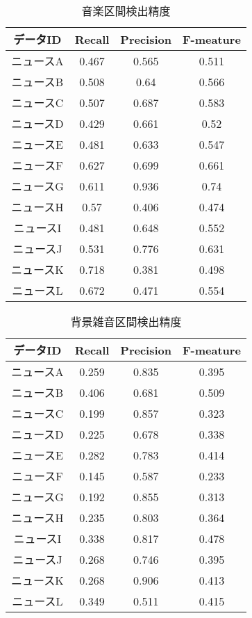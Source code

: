 \begin{table}[H]
  \begin{center}
    \caption{音楽区間検出精度 \label{table:NHK_music_RPF}}
    \begin{tabular}{|c||c|c|c|} \hline
データID & Recall & Precision & F-meature \\ \hline
ニュースA & 0.467 & 0.565 & 0.511 \\ \hline
ニュースB & 0.508 & 0.64 & 0.566 \\ \hline
ニュースC & 0.507 & 0.687 & 0.583 \\ \hline
ニュースD & 0.429 & 0.661 & 0.52 \\ \hline
ニュースE & 0.481 & 0.633 & 0.547 \\ \hline
ニュースF & 0.627 & 0.699 & 0.661 \\ \hline
ニュースG & 0.611 & 0.936 & 0.74 \\ \hline
ニュースH & 0.57 & 0.406 & 0.474 \\ \hline
ニュースI & 0.481 & 0.648 & 0.552 \\ \hline
ニュースJ & 0.531 & 0.776 & 0.631 \\ \hline
ニュースK & 0.718 & 0.381 & 0.498 \\ \hline
ニュースL & 0.672 & 0.471 & 0.554 \\ \hline
    \end{tabular}
  \end{center}
\end{table}

\begin{table}[H]
  \begin{center}
    \caption{背景雑音区間検出精度 \label{table:NHK_noise_RPF}}
    \begin{tabular}{|c||c|c|c|} \hline
データID & Recall & Precision & F-meature \\ \hline
ニュースA & 0.259 & 0.835 & 0.395 \\ \hline
ニュースB & 0.406 & 0.681 & 0.509 \\ \hline
ニュースC & 0.199 & 0.857 & 0.323 \\ \hline
ニュースD & 0.225 & 0.678 & 0.338 \\ \hline
ニュースE & 0.282 & 0.783 & 0.414 \\ \hline
ニュースF & 0.145 & 0.587 & 0.233 \\ \hline
ニュースG & 0.192 & 0.855 & 0.313 \\ \hline
ニュースH & 0.235 & 0.803 & 0.364 \\ \hline
ニュースI & 0.338 & 0.817 & 0.478 \\ \hline
ニュースJ & 0.268 & 0.746 & 0.395 \\ \hline
ニュースK & 0.268 & 0.906 & 0.413 \\ \hline
ニュースL & 0.349 & 0.511 & 0.415 \\ \hline
    \end{tabular}
  \end{center}
\end{table}

